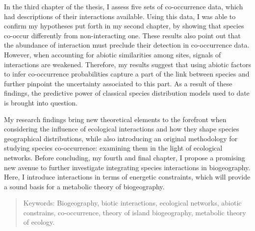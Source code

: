 In the third chapter of the thesis, I assess five sets of co-occurrence
data, which had descriptions of their interactions available. Using this
data, I was able to confirm my hypotheses put forth in my second
chapter, by showing that species co-occur differently from
non-interacting one. These results also point out that the abundance of
interaction must preclude their detection in co-occurrence data.
However, when accounting for abiotic similarities among sites, signals
of interactions are weakened. Therefore, my results suggest that using
abiotic factors to infer co-occurrence probabilities capture a part of
the link between species and further pinpoint the uncertainty associated
to this part. As a result of these findings, the predictive power of
classical species distribution models used to date is brought into
question.

My research findings bring new theoretical elements to the forefront
when considering the influence of ecological interactions and how they
shape species geographical distributions, while also introducing an
original methodology for studying species co-occurrence: examining them
in the light of ecological networks. Before concluding, my fourth and
final chapter, I propose a promising new avenue to further investigate
integrating species interactions in biogeography. Here, I introduce
interactions in terms of energetic constraints, which will provide a
sound basis for a metabolic theory of biogeography.

\begin{quote}
Keywords: Biogeography, biotic interactions, ecological networks,
abiotic constrains, co-occurrence, theory of island biogeography,
metabolic theory of ecology.
\end{quote}
